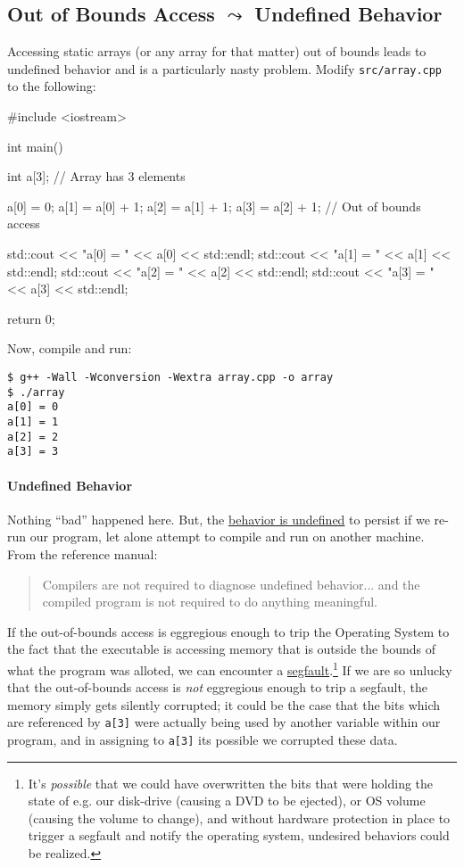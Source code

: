 \documentclass[12pt,letterpaper,twoside]{article}
\begin{document}
\subsection{Out of Bounds Access $\leadsto$ Undefined Behavior}

Accessing static arrays (or any array for that matter) out of bounds
leads to undefined behavior and is a particularly nasty problem. Modify
\texttt{src/array.cpp} to the following:

\begin{cpp}
#include <iostream>

int main() {
  int a[3]; // Array has 3 elements


  a[0] = 0;
  a[1] = a[0] + 1;
  a[2] = a[1] + 1;
  a[3] = a[2] + 1; // Out of bounds access


  std::cout << "a[0] = " << a[0] << std::endl;
  std::cout << "a[1] = " << a[1] << std::endl;
  std::cout << "a[2] = " << a[2] << std::endl;
  std::cout << "a[3] = " << a[3] << std::endl;

  return 0;
}
\end{cpp}

Now, compile and run:

\begin{verbatim}
$ g++ -Wall -Wconversion -Wextra array.cpp -o array
$ ./array
a[0] = 0
a[1] = 1
a[2] = 2
a[3] = 3
\end{verbatim}

\paragraph{Undefined Behavior}
Nothing ``bad'' happened here. But, the \href{https://en.cppreference.com/w/cpp/language/ub}{behavior is undefined} to
persist if we re-run our program, let alone attempt to compile and run
on another machine. From the reference manual:

\begin{quote}
  Compilers are not required to diagnose undefined behavior... and the
  compiled program is not required to do anything
  meaningful.
\end{quote}

If the out-of-bounds access is eggregious enough to trip the Operating
System to the fact that the executable is accessing memory that is
outside the bounds of what the program was alloted, we can encounter a
\href{https://en.wikipedia.org/wiki/Segmentation_fault}{segfault}.\footnote{It's \emph{possible}
that we could have overwritten the bits that were holding the state of
e.g. our disk-drive (causing a DVD to be ejected), or OS volume
(causing the volume to change), and without hardware protection in
place to trigger a segfault and notify the operating system, undesired
behaviors could be realized.} If we are so unlucky that the out-of-bounds access is
\emph{not} eggregious enough to trip a segfault, the memory simply
gets silently corrupted; it could be
the case that the bits which are referenced by \texttt{a[3]} were
actually being used by another variable within our program, and in
assigning to \texttt{a[3]} its possible we corrupted these data. 
\end{document}
